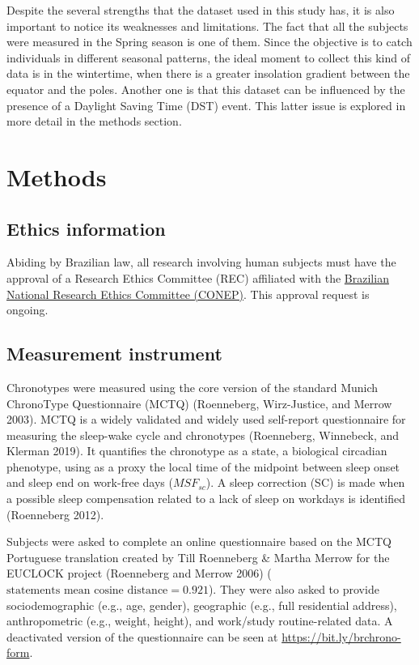 \documentclass[
  12pt,
  a4paper,
  oneside]{tesesusp}
\begin{document}
Despite the several strengths that the dataset used in this study has,
it is also important to notice its weaknesses and limitations. The fact
that all the subjects were measured in the Spring season is one of them.
Since the objective is to catch individuals in different seasonal
patterns, the ideal moment to collect this kind of data is in the
wintertime, when there is a greater insolation gradient between the
equator and the poles. Another one is that this dataset can be
influenced by the presence of a Daylight Saving Time (DST) event. This
latter issue is explored in more detail in the methods section.

\hypertarget{methods}{%
\section{Methods}\label{methods}}

\hypertarget{ethics-information}{%
\subsection{Ethics information}\label{ethics-information}}

Abiding by Brazilian law, all research involving human subjects must
have the approval of a Research Ethics Committee (REC) affiliated with
the
\href{https://conselho.saude.gov.br/Web_comissoes/conep/index.html}{Brazilian
National Research Ethics Committee (CONEP)}. This approval request is
ongoing.

\hypertarget{measurement-instrument}{%
\subsection{Measurement instrument}\label{measurement-instrument}}

Chronotypes were measured using the core version of the standard Munich
ChronoType Questionnaire (MCTQ) (Roenneberg, Wirz-Justice, and Merrow
2003). MCTQ is a widely validated and widely used self-report
questionnaire for measuring the sleep-wake cycle and chronotypes
(Roenneberg, Winnebeck, and Klerman 2019). It quantifies the chronotype
as a state, a biological circadian phenotype, using as a proxy the local
time of the midpoint between sleep onset and sleep end on work-free days
(\(MSF_{sc}\)). A sleep correction (SC) is made when a possible sleep
compensation related to a lack of sleep on workdays is identified
(Roenneberg 2012).

Subjects were asked to complete an online questionnaire based on the
MCTQ Portuguese translation created by Till Roenneberg \& Martha Merrow
for the EUCLOCK project (Roenneberg and Merrow 2006)
(\(\text{statements mean cosine distance} = 0.921\)). They were also
asked to provide sociodemographic (e.g., age, gender), geographic (e.g.,
full residential address), anthropometric (e.g., weight, height), and
work/study routine-related data. A deactivated version of the
questionnaire can be seen at \url{https://bit.ly/brchrono-form}.
\end{document}
